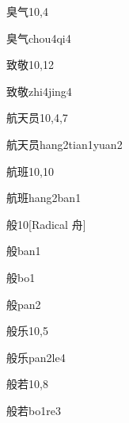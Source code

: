 \begin{entry}{臭气}{10,4}
  \begin{phonetics}{臭气}{chou4qi4}
  \end{phonetics}
\end{entry}

\begin{entry}{致敬}{10,12}
  \begin{phonetics}{致敬}{zhi4jing4}
  \end{phonetics}
\end{entry}

\begin{entry}{航天员}{10,4,7}
  \begin{phonetics}{航天员}{hang2tian1yuan2}
  \end{phonetics}
\end{entry}

\begin{entry}{航班}{10,10}
  \begin{phonetics}{航班}{hang2ban1}
  \end{phonetics}
\end{entry}

\begin{entry}{般}{10}[Radical 舟]
  \begin{phonetics}{般}{ban1}
  \end{phonetics}
  \begin{phonetics}{般}{bo1}
  \end{phonetics}
  \begin{phonetics}{般}{pan2}
  \end{phonetics}
\end{entry}

\begin{entry}{般乐}{10,5}
  \begin{phonetics}{般乐}{pan2le4}
  \end{phonetics}
\end{entry}

\begin{entry}{般若}{10,8}
  \begin{phonetics}{般若}{bo1re3}
  \end{phonetics}
\end{entry}

